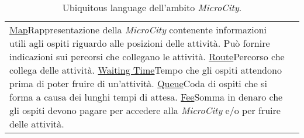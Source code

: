 \begin{table}[H]
\begin{tabular}{|l|p{}|}
        \ul{Map}{Rappresentazione della \textit{MicroCity} contenente informazioni utili agli ospiti riguardo alle posizioni delle attività. Può fornire indicazioni sui percorsi che collegano le attività.}
        \ul{Route}{Percorso che collega delle attività.}
        \ul{Waiting Time}{Tempo che gli ospiti attendono prima di poter fruire di un'attività.}
        \ul{Queue}{Coda di ospiti che si forma a causa dei lunghi tempi di attesa.}
        \ul{Fee}{Somma in denaro che gli ospiti devono pagare per accedere alla \textit{MicroCity} e/o per fruire delle attività.}
    \end{tabular}
    \caption{Ubiquitous language dell'ambito \textit{MicroCity}.}
    \label{tab:ul}
\end{table}